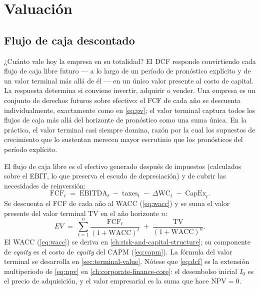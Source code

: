 \chapter{Valuación}\label{ch:valuation}


\section{Flujo de caja descontado}\label{sec:dcf}

¿Cuánto vale hoy la empresa en su totalidad? El DCF responde convirtiendo cada flujo de caja libre futuro
--- a lo largo de un período de pronóstico explícito y de un valor terminal más allá de él --- en un único
valor presente al costo de capital. La respuesta determina si conviene invertir, adquirir o vender. Una
empresa es un conjunto de derechos futuros sobre efectivo: el FCF de cada año se descuenta individualmente,
exactamente como en \cref{eq:pv}; el valor terminal captura todos los flujos de caja más allá del horizonte
de pronóstico como una suma única. En la práctica, el valor terminal casi siempre domina, razón por la cual
los supuestos de crecimiento que lo sustentan merecen mayor escrutinio que los pronósticos del período
explícito.

El flujo de caja libre es el efectivo generado después de impuestos (calculados sobre el EBIT, lo que
preserva el escudo de depreciación) y de cubrir las necesidades de reinversión:
\[
  \mathrm{FCF}_t \;=\; \mathrm{EBITDA}_t \;-\; \text{taxes}_t
                       \;-\; \Delta\mathrm{WC}_t \;-\; \mathrm{CapEx}_t.
\]
Se descuenta el FCF de cada año al WACC (\cref{eq:wacc}) y se suma el valor presente del valor terminal
\(\mathrm{TV}\) en el año horizonte \(n\):
\begin{equation}\label{eq:dcf}
  EV \;=\; \sum_{t=1}^{n}\frac{\mathrm{FCF}_t}{(1+\mathrm{WACC})^{t}}
           \;+\; \frac{\mathrm{TV}}{(1+\mathrm{WACC})^{n}}.
\end{equation}
El WACC (\cref{eq:wacc}) se deriva en \cref{ch:risk-and-capital-structure}; su componente de \emph{equity}
es el costo de \emph{equity} del CAPM (\cref{eq:capm}). La fórmula del valor terminal se desarrolla en
\cref{sec:terminal-value}. Nótese que \cref{eq:dcf} es la extensión multiperiodo de \cref{eq:npv} en
\cref{ch:corporate-finance-core}: el desembolso inicial \(I_0\) es el precio de adquisición, y el valor
empresarial es la suma que hace \(\mathrm{NPV}=0\).

